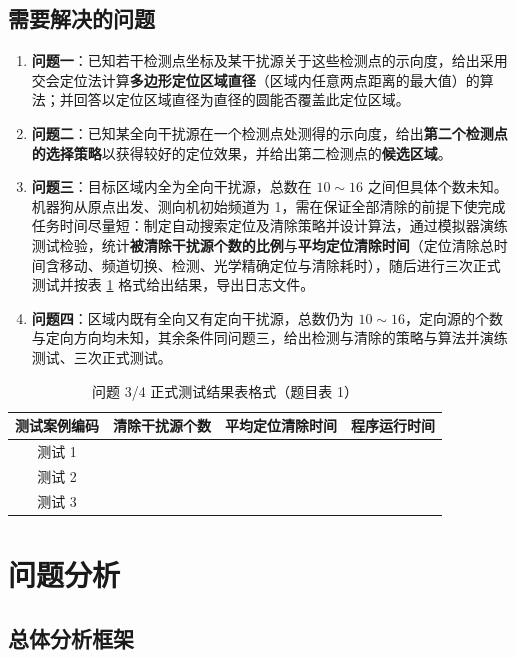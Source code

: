 \documentclass{cumcmthesis}
\begin{document}
\subsection{需要解决的问题}

\begin{enumerate}
  \item \textbf{问题一}：已知若干检测点坐标及某干扰源关于这些检测点的示向度，给出采用交会定位法计算\textbf{多边形定位区域直径}（区域内任意两点距离的最大值）的算法；并回答以定位区域直径为直径的圆能否覆盖此定位区域。
  \item \textbf{问题二}：已知某全向干扰源在一个检测点处测得的示向度，给出\textbf{第二个检测点的选择策略}以获得较好的定位效果，并给出第二检测点的\textbf{候选区域}。
  \item \textbf{问题三}：目标区域内全为全向干扰源，总数在 $10\sim16$ 之间但具体个数未知。机器狗从原点出发、测向机初始频道为 1，需在保证全部清除的前提下使完成任务时间尽量短：制定自动搜索定位及清除策略并设计算法，通过模拟器演练测试检验，统计\textbf{被清除干扰源个数的比例}与\textbf{平均定位清除时间}（定位清除总时间含移动、频道切换、检测、光学精确定位与清除耗时），随后进行三次正式测试并按表 \ref{tab:formal} 格式给出结果，导出日志文件。
  \item \textbf{问题四}：区域内既有全向又有定向干扰源，总数仍为 $10\sim16$，定向源的个数与定向方向均未知，其余条件同问题三，给出检测与清除的策略与算法并演练测试、三次正式测试。
\end{enumerate}

\begin{table}[H]
\centering
\caption{问题 3/4 正式测试结果表格式（题目表 1）}\label{tab:formal}
\begin{tabular}{cccc}
\toprule
测试案例编码 & 清除干扰源个数 & 平均定位清除时间 & 程序运行时间\\
\midrule
测试 1 &&& \\
测试 2 &&& \\
测试 3 &&& \\
\bottomrule
\end{tabular}
\end{table}

\section{问题分析}

\subsection{总体分析框架}
\end{document}
